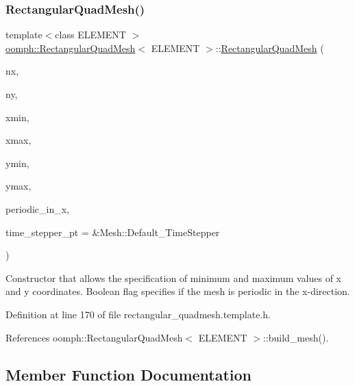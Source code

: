 \subsubsection{\texorpdfstring{Rectangular\+Quad\+Mesh()}{RectangularQuadMesh()}\hspace{0.1cm}{\footnotesize\ttfamily [5/5]}}
{\footnotesize\ttfamily template$<$class E\+L\+E\+M\+E\+NT $>$ \\
\hyperlink{classoomph_1_1RectangularQuadMesh}{oomph\+::\+Rectangular\+Quad\+Mesh}$<$ E\+L\+E\+M\+E\+NT $>$\+::\hyperlink{classoomph_1_1RectangularQuadMesh}{Rectangular\+Quad\+Mesh} (\begin{DoxyParamCaption}\item[{const unsigned \&}]{nx,  }\item[{const unsigned \&}]{ny,  }\item[{const double \&}]{xmin,  }\item[{const double \&}]{xmax,  }\item[{const double \&}]{ymin,  }\item[{const double \&}]{ymax,  }\item[{const bool \&}]{periodic\+\_\+in\+\_\+x,  }\item[{Time\+Stepper $\ast$}]{time\+\_\+stepper\+\_\+pt = {\ttfamily \&Mesh\+:\+:Default\+\_\+TimeStepper} }\end{DoxyParamCaption})\hspace{0.3cm}{\ttfamily [inline]}}



Constructor that allows the specification of minimum and maximum values of x and y coordinates. Boolean flag specifies if the mesh is periodic in the x-\/direction. 



Definition at line 170 of file rectangular\+\_\+quadmesh.\+template.\+h.



References oomph\+::\+Rectangular\+Quad\+Mesh$<$ E\+L\+E\+M\+E\+N\+T $>$\+::build\+\_\+mesh().



\subsection{Member Function Documentation}
\mbox{\label{classoomph_1_1RectangularQuadMesh_afa579b413a2d8120e8228d840cb3582c}} 
